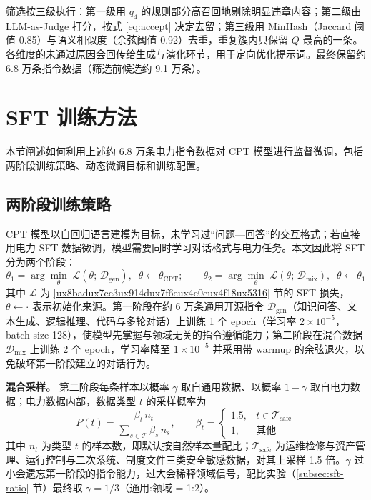\documentclass[fontset=fandol,type=master,campus=shenzhen,etitleauto=true]{hithesisbook}
\begin{document}
筛选按三级执行：第一级用 $q_4$ 的规则部分高召回地剔除明显违章内容；第二级由 LLM-as-Judge\cite{ref65} 打分，按式 \eqref{eq:accept} 决定去留；第三级用 MinHash（Jaccard 阈值 0.85）与语义相似度（余弦阈值 0.92）去重，重复簇内只保留 $Q$ 最高的一条。各维度的未通过原因会回传给生成与演化环节，用于定向优化提示词。最终保留约 6.8 万条指令数据（筛选前候选约 9.1 万条）。

\section{SFT 训练方法}\label{sec:sft-train}

本节阐述如何利用上述约 6.8 万条电力指令数据对 CPT 模型进行监督微调，包括两阶段训练策略、动态微调目标和训练配置。

\subsection{两阶段训练策略}\label{ux4e24ux9636ux6bb5-sft-ux7b56ux7565}

CPT 模型以自回归语言建模为目标，未学习过“问题—回答”的交互格式；若直接用电力 SFT 数据微调，模型需要同时学习对话格式与电力任务。本文因此将 SFT 分为两个阶段：
\begin{equation}\label{eq:sft-stage}
\theta_1 = \arg\min_{\theta} \; \mathcal{L}(\theta;\, \mathcal{D}_{\text{gen}}), \;\; \theta \leftarrow \theta_{\text{CPT}}; \qquad
\theta_2 = \arg\min_{\theta} \; \mathcal{L}(\theta;\, \mathcal{D}_{\text{mix}}), \;\; \theta \leftarrow \theta_1
\end{equation}
其中 $\mathcal{L}$ 为 \ref{ux8badux7ec3ux914dux7f6eux4e0eux4f18ux5316} 节的 SFT 损失，$\theta \leftarrow \cdot$ 表示初始化来源。第一阶段在约 6 万条通用开源指令 $\mathcal{D}_{\text{gen}}$（知识问答、文本生成、逻辑推理、代码与多轮对话）上训练 1 个 epoch（学习率 $2 \times 10^{-5}$，batch size 128），使模型先掌握与领域无关的指令遵循能力；第二阶段在混合数据 $\mathcal{D}_{\text{mix}}$ 上训练 2 个 epoch，学习率降至 $1 \times 10^{-5}$ 并采用带 warmup 的余弦退火，以免破坏第一阶段建立的对话行为。

\textbf{混合采样。} 第二阶段每条样本以概率 $\gamma$ 取自通用数据、以概率 $1 - \gamma$ 取自电力数据；电力数据内部，数据类型 $t$ 的采样概率为
\begin{equation}\label{eq:sft-sampling}
P(t) = \frac{\beta_t\, n_t}{\sum_{s \in \mathcal{T}} \beta_s\, n_s}, \qquad
\beta_t = \begin{cases} 1.5, & t \in \mathcal{T}_{\text{safe}} \\ 1, & \text{其他} \end{cases}
\end{equation}
其中 $n_t$ 为类型 $t$ 的样本数，即默认按自然样本量配比；$\mathcal{T}_{\text{safe}}$ 为运维检修与资产管理、运行控制与二次系统、制度文件三类安全敏感数据，对其上采样 1.5 倍。$\gamma$ 过小会遗忘第一阶段的指令能力，过大会稀释领域信号，配比实验（\ref{subsec:sft-ratio} 节）最终取 $\gamma = 1/3$（通用:领域 = 1:2）。
\end{document}
